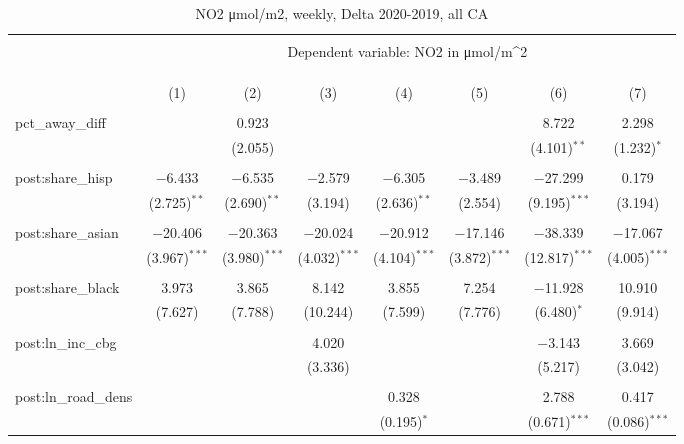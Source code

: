 
\begin{table}[!htbp] \centering 
  \caption{NO2 μmol/m2, weekly, Delta 2020-2019, all CA} 
  \label{} 
\begin{tabular}{@{\extracolsep{5pt}}lccccccc} 
\\[-1.8ex]\hline 
\hline \\[-1.8ex] 
 & \multicolumn{7}{c}{Dependent variable: NO2 in μmol/m^2} \\ 
\cline{2-8} 
\\[-1.8ex] & \multicolumn{7}{c}{} \\ 
\\[-1.8ex] & (1) & (2) & (3) & (4) & (5) & (6) & (7)\\ 
\hline \\[-1.8ex] 
 pct\_away\_diff &  & 0.923 &  &  &  & 8.722 & 2.298 \\ 
  &  & (2.055) &  &  &  & (4.101)$^{**}$ & (1.232)$^{*}$ \\ 
  & & & & & & & \\ 
 post:share\_hisp & $-$6.433 & $-$6.535 & $-$2.579 & $-$6.305 & $-$3.489 & $-$27.299 & 0.179 \\ 
  & (2.725)$^{**}$ & (2.690)$^{**}$ & (3.194) & (2.636)$^{**}$ & (2.554) & (9.195)$^{***}$ & (3.194) \\ 
  & & & & & & & \\ 
 post:share\_asian & $-$20.406 & $-$20.363 & $-$20.024 & $-$20.912 & $-$17.146 & $-$38.339 & $-$17.067 \\ 
  & (3.967)$^{***}$ & (3.980)$^{***}$ & (4.032)$^{***}$ & (4.104)$^{***}$ & (3.872)$^{***}$ & (12.817)$^{***}$ & (4.005)$^{***}$ \\ 
  & & & & & & & \\ 
 post:share\_black & 3.973 & 3.865 & 8.142 & 3.855 & 7.254 & $-$11.928 & 10.910 \\ 
  & (7.627) & (7.788) & (10.244) & (7.599) & (7.776) & (6.480)$^{*}$ & (9.914) \\ 
  & & & & & & & \\ 
 post:ln\_inc\_cbg &  &  & 4.020 &  &  & $-$3.143 & 3.669 \\ 
  &  &  & (3.336) &  &  & (5.217) & (3.042) \\ 
  & & & & & & & \\ 
 post:ln\_road\_dens &  &  &  & 0.328 &  & 2.788 & 0.417 \\ 
  &  &  &  & (0.195)$^{*}$ &  & (0.671)$^{***}$ & (0.086)$^{***}$ \\ 

\end{tabular}
\end{table}
